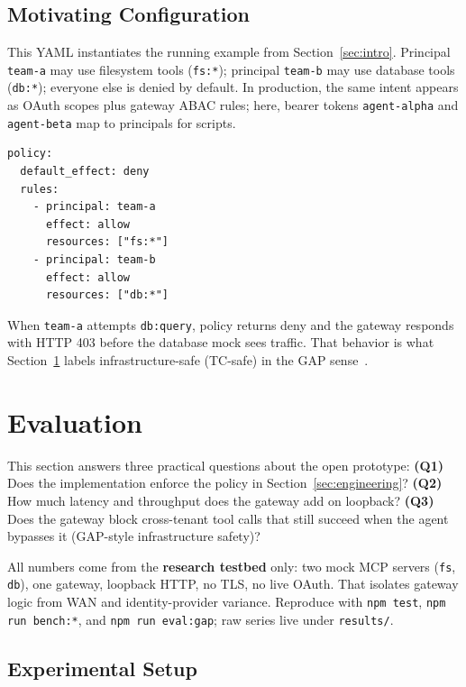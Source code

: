 \documentclass[11pt]{article}
\newcommand{\code}[1]{\texttt{#1}}
\begin{document}
\subsection{Motivating Configuration}

This YAML instantiates the running example from Section~\ref{sec:intro}.
Principal \code{team-a} may use filesystem tools (\code{fs:*}); principal \code{team-b} may use database tools (\code{db:*}); everyone else is denied by default.
In production, the same intent appears as OAuth scopes plus gateway ABAC rules; here, bearer tokens \code{agent-alpha} and \code{agent-beta} map to principals for scripts.

\begin{small}
\begin{verbatim}
policy:
  default_effect: deny
  rules:
    - principal: team-a
      effect: allow
      resources: ["fs:*"]
    - principal: team-b
      effect: allow
      resources: ["db:*"]
\end{verbatim}
\end{small}

When \code{team-a} attempts \code{db:query}, policy returns deny and the gateway responds with HTTP 403 before the database mock sees traffic.
That behavior is what Section~\ref{sec:eval} labels infrastructure-safe (TC-safe) in the GAP sense~\cite{gap2026}.

\section{Evaluation}
\label{sec:eval}

This section answers three practical questions about the open prototype:
\textbf{(Q1)} Does the implementation enforce the policy in Section~\ref{sec:engineering}?
\textbf{(Q2)} How much latency and throughput does the gateway add on loopback?
\textbf{(Q3)} Does the gateway block cross-tenant tool calls that still succeed when the agent bypasses it (GAP-style infrastructure safety)?

All numbers come from the \textbf{research testbed} only: two mock MCP servers (\code{fs}, \code{db}), one gateway, loopback HTTP, no TLS, no live OAuth.
That isolates gateway logic from WAN and identity-provider variance.
Reproduce with \code{npm test}, \code{npm run bench:*}, and \code{npm run eval:gap}; raw series live under \code{results/}.

\subsection{Experimental Setup}
\end{document}
